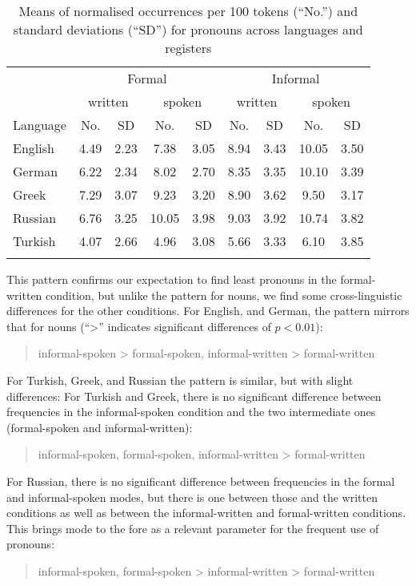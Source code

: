 \documentclass[output=paper,colorlinks,citecolor=brown]{langscibook}
\begin{document}
\begin{table}
\begin{tabular}{l *8{c}}
\lsptoprule
         & \multicolumn{4}{c}{Formal} & \multicolumn{4}{c}{{Informal}}\\\cmidrule(lr){2-5}\cmidrule(lr){6-9}
         & \multicolumn{2}{c}{{{written}}} & \multicolumn{2}{c}{{{spoken}}} & \multicolumn{2}{c}{{{written}}} & \multicolumn{2}{c}{{{spoken}}}\\
         \cmidrule(lr){2-3}\cmidrule(lr){4-5}\cmidrule(lr){6-7}\cmidrule(lr){8-9}
Language & No. & SD & No. & SD & No. & SD & No. & SD  \\\midrule
English & 4.49 & 2.23 & 7.38 & 3.05 & 8.94 & 3.43 & 10.05 & 3.50   \\
German & 6.22 & 2.34 & 8.02 & 2.70 & 8.35 & 3.35 & 10.10 & 3.39 \\
Greek & 7.29 & 3.07 & 9.23 & 3.20 & 8.90 & 3.62 & 9.50 & 3.17 \\
Russian & 6.76 & 3.25 & 10.05 & 3.98 & 9.03 & 3.92 & 10.74 & 3.82\\
Turkish & 4.07 & 2.66 & 4.96 & 3.08 & 5.66 & 3.33 & 6.10 & 3.85 \\
\lspbottomrule
\end{tabular}
\caption{Means of normalised occurrences per 100 tokens (“No.”) and standard deviations (“SD”) for pronouns across languages and registers}
\label{tab:ch1:tab2}
\end{table}
\newpage
This pattern confirms our expectation to find least pronouns in the formal-written condition, but unlike the pattern for nouns, we find some cross-linguistic differences for the other conditions. For English, and German, the pattern mirrors that for nouns (“>” indicates significant differences of $p<0.01$):
\begin{quote}
informal-spoken > formal-spoken, informal-written > formal-written    
\end{quote}


For Turkish, Greek, and Russian the pattern is similar, but with slight differences: For Turkish and Greek, there is no significant difference between frequencies in the informal-spoken condition and the two intermediate ones (formal\hyp spoken and informal\hyp written):
\begin{quote}
informal-spoken, formal-spoken, informal-written > formal-written 
\end{quote}

For Russian, there is no significant difference between frequencies in the formal and informal-spoken modes, but there is one between those and the written conditions as well as between the informal-written and formal-written conditions. This brings mode to the fore as a relevant parameter for the frequent use of pronouns:
\begin{quote}
informal-spoken, formal-spoken > informal-written > formal-written  
\end{quote}
\end{document}
